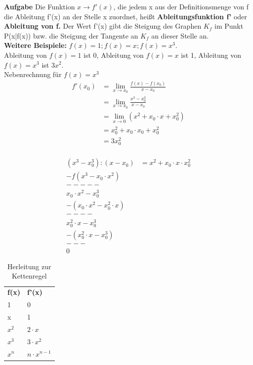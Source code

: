 \documentclass{report}
\begin{document}
\noindent\textbf{Aufgabe}
Die Funktion $x \to f'(x)$, die jedem x aus der Definitionsmenge von f die
Ableitung f'(x) an der Stelle x zuordnet, heißt \textbf{Ableitungsfunktion f'}
oder \textbf{Ableitung von f.} Der Wert f'(x) gibt die Steigung des Graphen
$K_f$ im Punkt P(x|f(x)) bzw. die Steigung der Tangente an $K_f$ an dieser
Stelle an.\\

\noindent \textbf{Weitere Beispiele:} $f(x)=1; f(x)=x; f(x)=x^3$.\\
Ableitung von $f(x)=1$ ist 0, Ableitung von $f(x)=x$ ist 1, Ableitung von
$f(x)=x^3$ ist $3x^2$.\\
Nebenrechnung für $f(x)=x^3$\\

\begin{align*}
f'(x_0) &= \lim_{x\to x_0}\frac{f(x)-f(x_0)}{x-x_0} \\ 
        &=\lim_{x\to x_0}\frac{x^3-x_0^3}{x-x_0}\\
        &=\lim_{x \to 0}(x^2+x_0\cdot x+x_0^2)\\
        &=x_0^2+x_0\cdot x_0+x_0^2\\
        &=3x_0^2\\
\end{align*}

\begin{align*}
  (x^3-x_0^3):(x-x_0)&=x^2+x_0\cdot x\cdot x_0^2\\
  -f(x^3-x_0\cdot x^2) \\
  -----\\
  x_0\cdot x^2-x_0^3 \\
  -(x_0\cdot x^2-x_0^2\cdot x)\\
  ----\\
  x_0^2\cdot x-x_0^3 \\ 
  -(x_0^2\cdot x-x_0^3)\\
  ---\\
  0
\end{align*}

\begin{table}[h]
  \label{tab:tablee-abl}
  \begin{center}
    \begin{tabular}[c]{l|l}
      \hline
      \multicolumn{1}{r|}{\textbf{f(x)}} & 
      \multicolumn{1}{l}{\textbf{f'(x)}} \\
      1 & 0 \\
      x & 1 \\
      $x^2$ & $2\cdot x$ \\
      $x^3$ & $3\cdot x^2$ \\
      $x^n$ & $n\cdot x^{n-1}$ \\
    \end{tabular}
  \end{center}
  \caption{Herleitung zur Kettenregel}
\end{table}
\end{document}
